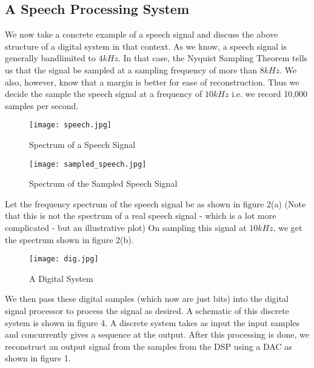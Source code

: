 \subsection{A Speech Processing System}
We now take a concrete example of a speech signal and discuss the above structure of a digital system in that context.
As we know, a speech signal is generally bandlimited to $4 kHz$. In that case, the Nyquist Sampling Theorem tells us that the signal be sampled at a sampling frequency of more than $8 kHz$. We also, however, know that a margin is better for ease of reconstruction. Thus we decide the sample the speech signal at a frequency of $10 kHz$ i.e. we record 10,000 samples per second. 


\begin{figure}[H]
    \texttt{[image: speech.jpg]}
    \caption{Spectrum of a Speech Signal}
\end{figure}%
       

\begin{figure}[H]
    \texttt{[image: sampled\_speech.jpg]}
    \caption{Spectrum of the Sampled Speech Signal}
\end{figure}

Let the frequency spectrum of the speech signal be as shown in figure 2(a) (Note that this is not the spectrum of a real speech signal - which is a lot more complicated - but an illustrative plot) On sampling this signal at $10 kHz$, we get the spectrum shown in figure 2(b). 


\begin{figure}[H]
 	\texttt{[image: dig.jpg]}
    \caption{A Digital System}
\end{figure}

We then pass these digital samples (which now are just bits) into the digital signal processor to process the signal as desired. %
A schematic of this discrete system is shown in figure 4. A discrete system takes as input the input samples and concurrently gives a sequence at the output. After this processing is done, we reconstruct an output signal from the samples from the DSP using a DAC as shown in figure 1.


